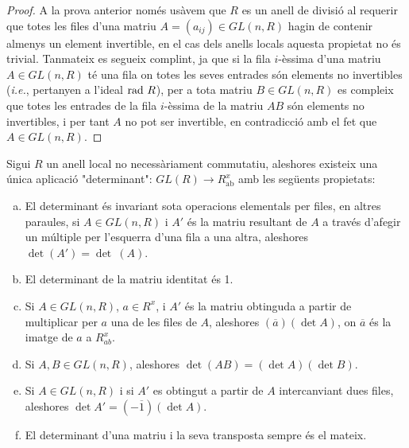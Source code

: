 \begin{proof}
A la prova anterior només usàvem que $R$ es un anell de divisió al requerir que totes les files d'una matriu $A=(a_{ij})\in GL(n,R)$ hagin de contenir almenys un element invertible, en el cas dels anells locals aquesta propietat no és trivial. Tanmateix es segueix complint, ja que si la fila $i$-èssima d'una matriu $A\in GL(n,R)$ té una fila on totes les seves entrades són elements no invertibles (\textit{i.e.}, pertanyen a l'ideal $\mathrm{rad} \  R$), per a tota matriu $B\in GL(n,R)$ es compleix que totes les entrades de la fila $i$-èssima de la matriu $AB$ són elements no invertibles, i per tant $A$ no pot ser invertible, en contradicció amb el fet que $A\in GL(n,R)$.
\end{proof}

\begin{theorem}\label{bigOne}
Sigui $R$ un anell local no necessàriament commutatiu, aleshores existeix una única aplicació "determinant":  $GL(R)\rightarrow R^x_{\text{ab}}$ amb les següents propietats:
\begin{enumerate}[a)]
\item El determinant és invariant sota operacions elementals per files, en altres paraules, si $A\in GL(n,R)$ i $A'$ és la matriu resultant de $A$ a través d'afegir un múltiple per l'esquerra d'una fila a una altra, aleshores $\det (A')=\det \ (A)$.
\item El determinant de la matriu identitat és 1.
\item Si $A\in GL(n,R)$, $a\in R^x$, i $A'$ és la matriu obtinguda a partir de multiplicar per $a$ una de les files de $A$,  aleshores $(\overline{a})(\det A)$, on $\overline{a}$ és la imatge de $a$ a $R^x_{ab}$.
\item Si $A,B\in GL(n,R)$, aleshores $\det(AB) = (\det A) (\det B)$.
\item Si $A\in GL(n,R)$ i si $A'$ es obtingut a partir de $A$ intercanviant dues files, aleshores $\det A' = (-{\overline{1}})(\det A)$.
\item El determinant d'una matriu i la seva transposta sempre és el mateix.
\end{enumerate}
\end{theorem}
